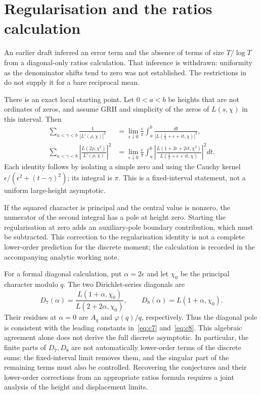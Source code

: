 \documentclass[11pt]{amsart}
\begin{document}
\section{Regularisation and the ratios calculation}\label{sec:ratios}

An earlier draft inferred an error term and the absence of terms of size $T/\log T$ from a diagonal-only ratios
calculation. That inference is withdrawn: uniformity as the denominator shifts tend to zero was not established.
The restrictions in~\cite[(2.11) and Remark~2.2]{CS} do not supply it for a bare reciprocal mean.

There is an exact local starting point. Let $0<a<b$ be heights that are not ordinates of zeros, and assume GRH
and simplicity of the zeros of $L(s,\chi)$ in this interval. Then
\begin{align*}
\sum_{a<\gamma<b}\frac{1}{|L'(\rho,\chi)|^2}
 &=\lim_{\epsilon\downarrow0}\frac{\epsilon}{\pi}
    \int_a^b\frac{dt}{|L(\tfrac12+\epsilon+it,\chi)|^2},\\
\sum_{a<\gamma<b}\left|\frac{L(2\rho,\chi^2)}{L'(\rho,\chi)}\right|^2
 &=\lim_{\epsilon\downarrow0}\frac{\epsilon}{\pi}
    \int_a^b\left|\frac{L(1+2\epsilon+2it,\chi^2)}{L(\tfrac12+\epsilon+it,\chi)}\right|^2dt.
\end{align*}
Each identity follows by isolating a simple zero and using the Cauchy kernel
$\epsilon/(\epsilon^2+(t-\gamma)^2)$; its integral is $\pi$. This is a fixed-interval statement, not a
uniform large-height asymptotic.

If the squared character is principal and the central value is nonzero, the numerator of the second integral has
a pole at height zero. Starting the regularisation at zero adds an auxiliary-pole boundary contribution,
which must be subtracted. This correction to the regularisation identity is not a complete lower-order prediction
for the discrete moment; the calculation is recorded in the accompanying analytic working note.

For a formal diagonal calculation, put $\alpha=2\epsilon$ and let $\chi_0$ be the principal character modulo $q$.
The two Dirichlet-series diagonals are
\[
D_7(\alpha)=\frac{L(1+\alpha,\chi_0)}{L(2+2\alpha,\chi_0)},\qquad
D_8(\alpha)=L(1+\alpha,\chi_0).
\]
Their residues at $\alpha=0$ are $A_q$ and $\varphi(q)/q$, respectively. Thus the diagonal pole is consistent
with the leading constants in~\eqref{eq:c7} and~\eqref{eq:c8}. This algebraic agreement alone does not derive
the full discrete asymptotic. In particular, the finite parts of $D_7,D_8$ are not automatically lower-order
terms of the discrete sums: the fixed-interval limit removes them, and the singular part of the remaining
terms must also be controlled. Recovering the conjectures and their lower-order corrections from an appropriate
ratios formula requires a joint analysis of the height and displacement limits.
\end{document}
